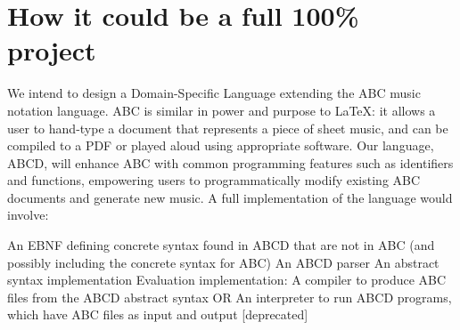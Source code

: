 \section{How it could be a full 100\% project}
We intend to design a Domain-Specific Language extending the ABC music notation language. ABC is similar in power and purpose to LaTeX: it allows a user to hand-type a document that represents a piece of sheet music, and can be compiled to a PDF or played aloud using appropriate software. Our language, ABCD, will enhance ABC with common programming features such as identifiers and functions, empowering users to programmatically modify existing ABC documents and generate new music. 
	A full implementation of the language would involve:

An EBNF defining concrete syntax found in ABCD that are not in ABC (and possibly including the concrete syntax for ABC)
An ABCD parser
An abstract syntax implementation
Evaluation implementation:
A compiler to produce ABC files from the ABCD abstract syntax OR
An interpreter to run ABCD programs, which have ABC files as input and output [deprecated]

